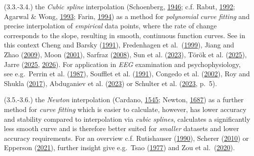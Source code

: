 \documentclass[
]{article}
\begin{document}
(3.3.-3.4.) the \emph{Cubic spline} interpolation (Schoenberg,
\href{https://doi.org/10.1090/qam/15914}{1946}; c.f. Rabut,
\href{https://doi.org/10.1016/0898-1221(92)90177-J}{1992}; Agarwal \&
Wong, \href{https://doi.org/10.1007/978-94-011-2026-5_6}{1993}; Farin,
\href{https://doi.org/10.1007/978-3-663-10602-9_9}{1994}) as a method
for \emph{polynomial} \emph{curve fitting} and precise interpolation of
\emph{empirical} data points, where the rate of change corresponds to
the slope, resulting in smooth, continuous function curves. See in this
context Cheng and Barsky
(\href{https://doi.org/10.1016/0010-4485(91)90023-P}{1991}), Fredenhagen
et al.~(\href{https://doi.org/10.1006/jath.1998.3247}{1999}), Jiang and
Zhao (\href{https://doi.org/10.1109/FSKD.2009.591}{2009}), Moon
(\href{https://doi.org/10.1016/S0096-3003(99)00178-2}{2001}), Sarfraz
(\href{https://doi.org/10.1007/978-1-84628-871-5_8}{2008}), Sun et al.
(\href{https://doi.org/10.1016/j.cam.2022.115039}{2023}), Török et al.
(\href{https://doi.org/10.1016/j.amc.2025.129411}{2025}), Jarre
(\href{https://doi.org/10.48550/arXiv.2507.05083}{2025},
\href{https://doi.org/10.1016/j.cam.2025.117240}{2026}). For application
in \emph{EEG} examination and psychophysiology, see e.g.~Perrin et al.
(\href{https://doi.org/10.1016/0013-4694(87)90141-6}{1987}), Soufflet et
al. (\href{https://doi.org/10.1016/0013-4694(91)90204-H}{1991}), Congedo
et al. (\href{https://doi.org/10.1300/J184v06n04_08}{2002}), Roy and
Shukla (\href{https://doi.org/10.1007/s11277-017-4846-3}{2017}),
Abduganiev et al.
(\href{https://doi.org/10.1007/978-3-031-27199-1_3}{2023}) or Schulter
et al. (\href{https://doi.org/10.1038/s41598-023-49307-7}{2023}, p.~5).

(3.5.-3.6.) the \emph{Newton} interpolation (Cardano,
\href{https://web.archive.org/web/20220201093634/http:/www.filosofia.unimi.it/cardano/testi/operaomnia/vol_4_s_4.pdf}{1545};
Newton,
\href{https://books.google.at/books?id=XJwx0lnKvOgC\&pg=PP2\&redir_esc=y\#v=onepage\&q\&f=false}{1687})
as a further method for \emph{curve fitting} which is easier to
calculate, however, has lower accuracy and stability compared to
interpolation via \emph{cubic splines}, calculates a significantly less
smooth curve and is therefore better suited for \emph{smaller} datasets
and lower accuracy requirements. For an overview c.f. Rutishauser
(\href{https://doi.org/10.1007/978-1-4612-3468-5_6}{1990}), Scherer
(\href{https://doi.org/10.1007/978-3-642-13990-1_2}{2010}) or Epperson
(\href{https://doi.org/10.1002/9781119604570.ch4}{2021}), further
insight give e.g.~Tsao (\href{https://doi.org/10.1007/BF01389317}{1977})
and Zou et al.~(\href{https://doi.org/10.1155/2020/9020541}{2020}).
\end{document}
